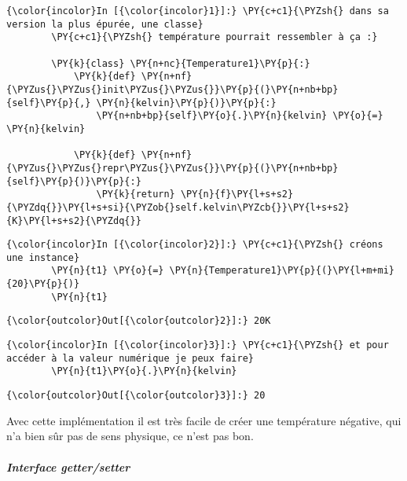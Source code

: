     \begin{Verbatim}[commandchars=\\\{\}]
{\color{incolor}In [{\color{incolor}1}]:} \PY{c+c1}{\PYZsh{} dans sa version la plus épurée, une classe}
        \PY{c+c1}{\PYZsh{} température pourrait ressembler à ça :}
        
        \PY{k}{class} \PY{n+nc}{Temperature1}\PY{p}{:}
            \PY{k}{def} \PY{n+nf}{\PYZus{}\PYZus{}init\PYZus{}\PYZus{}}\PY{p}{(}\PY{n+nb+bp}{self}\PY{p}{,} \PY{n}{kelvin}\PY{p}{)}\PY{p}{:}
                \PY{n+nb+bp}{self}\PY{o}{.}\PY{n}{kelvin} \PY{o}{=} \PY{n}{kelvin}
                
            \PY{k}{def} \PY{n+nf}{\PYZus{}\PYZus{}repr\PYZus{}\PYZus{}}\PY{p}{(}\PY{n+nb+bp}{self}\PY{p}{)}\PY{p}{:}
                \PY{k}{return} \PY{n}{f}\PY{l+s+s2}{\PYZdq{}}\PY{l+s+si}{\PYZob{}self.kelvin\PYZcb{}}\PY{l+s+s2}{K}\PY{l+s+s2}{\PYZdq{}}
\end{Verbatim}


    \begin{Verbatim}[commandchars=\\\{\}]
{\color{incolor}In [{\color{incolor}2}]:} \PY{c+c1}{\PYZsh{} créons une instance}
        \PY{n}{t1} \PY{o}{=} \PY{n}{Temperature1}\PY{p}{(}\PY{l+m+mi}{20}\PY{p}{)}
        \PY{n}{t1}
\end{Verbatim}


\begin{Verbatim}[commandchars=\\\{\}]
{\color{outcolor}Out[{\color{outcolor}2}]:} 20K
\end{Verbatim}
            
    \begin{Verbatim}[commandchars=\\\{\}]
{\color{incolor}In [{\color{incolor}3}]:} \PY{c+c1}{\PYZsh{} et pour accéder à la valeur numérique je peux faire}
        \PY{n}{t1}\PY{o}{.}\PY{n}{kelvin}
\end{Verbatim}


\begin{Verbatim}[commandchars=\\\{\}]
{\color{outcolor}Out[{\color{outcolor}3}]:} 20
\end{Verbatim}
            
    Avec cette implémentation il est très facile de créer une température
négative, qui n'a bien sûr pas de sens physique, ce n'est pas bon.

    \hypertarget{interface-gettersetter}{%
\subparagraph{\texorpdfstring{Interface
\emph{getter/setter}\\\\}{Interface getter/setter}}\label{interface-gettersetter}}

